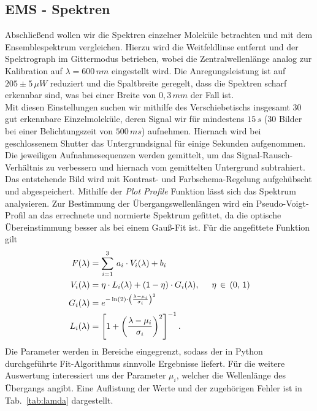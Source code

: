 \subsection{\label{subsec:A4}EMS - Spektren}
Abschließend wollen wir die Spektren einzelner Moleküle betrachten und mit dem Ensemblespektrum vergleichen. 
Hierzu wird die Weitfeldlinse entfernt und der Spektrograph im Gittermodus betrieben, wobei die 
Zentralwellenlänge analog zur Kalibration auf $\lambda=600\,\si{nm}$ eingestellt wird. Die Anregungsleistung ist 
auf $205\pm5\,\si{\mu W}$ reduziert und die Spaltbreite geregelt, dass die Spektren scharf erkennbar sind, 
was bei einer Breite von $0,3\,\si{mm}$ der Fall ist. \\
Mit diesen Einstellungen suchen wir mithilfe des Verschiebetischs insgesamt 30 gut erkennbare Einzelmoleküle, 
deren Signal wir für mindestens $15\,\si{s}$ (30 Bilder bei einer Belichtungszeit von $500\,\si{ms}$) aufnehmen. 
Hiernach wird bei geschlossenem Shutter das Untergrundsignal für einige Sekunden aufgenommen. \\
Die jeweiligen Aufnahmesequenzen werden gemittelt, um das Signal-Rausch-Verhältnis zu verbessern und hiernach vom 
gemittelten Untergrund subtrahiert. Das entstehende Bild wird mit Kontrast- und Farbschema-Regelung aufgehübscht 
und abgespeichert. Mithilfe der \textit{Plot Profile} Funktion lässt sich das Spektrum analysieren.
Zur Bestimmung der Übergangswellenlängen wird ein Pseudo-Voigt-Profil an das errechnete und normierte Spektrum gefittet, 
da die optische Übereinstimmung besser als bei einem Gauß-Fit ist. 
Für die angefittete Funktion gilt
\begin{align}
    F(\lambda) &= \sum_{i=1}^{3}\,a_{i}\cdot V_{i}(\lambda) + b_{i} \\
    V_{i}(\lambda) &= \eta \cdot L_{i}(\lambda) + (1-\eta )\cdot G_{i}(\lambda),\hspace{0.5cm}\eta\,\in\,(0,\,1) \\
    G_{i}(\lambda) &= e^{-\ln(2)\cdot\left(\frac{\lambda - \mu_{i}}{\sigma_{i}}\right)^{2}} \\
    L_{i}(\lambda) &= \left[1+\left(\frac{\lambda - \mu_{i}}{\sigma_{i}}\right)^{2}\right]^{-1}.
\end{align}
Die Parameter werden in Bereiche eingegrenzt, sodass der in Python durchgeführte Fit-Algorithmus sinnvolle 
Ergebnisse liefert. Für die weitere Auswertung interessiert uns der Parameter $\mu_{i}$, welcher die Wellenlänge des 
Übergangs angibt. Eine Auflistung der Werte und der zugehörigen Fehler ist in Tab.~\ref{tab:lamda} dargestellt. 
